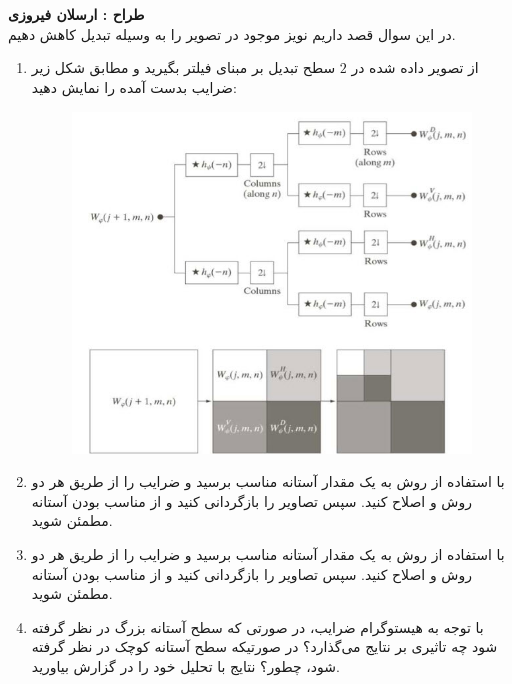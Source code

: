 \documentclass[a4paper]{article}
\begin{document}
\section{}
\textbf{طراح :‌ ارسلان فیروزی}
\vspace{0.5cm}
\\
در این سوال قصد داریم نویز موجود در تصویر
 را به وسیله تبدیل
کاهش دهیم.
\begin{enumerate}
	\item 
از تصویر داده شده در $ 2 $ سطح تبدیل
 بر مبنای فیلتر
بگیرید و مطابق شکل زیر ضرایب بدست آمده را نمایش دهید:
	\begin{figure}[H]
		\centering
		\includegraphics[width=0.7 \linewidth]{q3}
		\caption{
		}
		\label{q3}
	\end{figure}
	\item 
با استفاده از روش
 به یک مقدار آستانه مناسب برسید و ضرایب را از طریق هر دو روش 
 و 
 اصلاح کنید. سپس تصاویر را بازگردانی کنید و از مناسب بودن آستانه مطمئن شوید. 
	\item 
با استفاده از روش
 به یک مقدار آستانه مناسب برسید و ضرایب را از طریق هر دو روش 
و 
 اصلاح کنید. سپس تصاویر را بازگردانی کنید و از مناسب بودن آستانه مطمئن شوید. 
	\item 
با توجه به هیستوگرام ضرایب، در صورتی که سطح آستانه بزرگ در نظر گرفته شود چه تاثیری بر نتایج می‌‌گذارد؟ در صورتیکه سطح آستانه کوچک در نظر گرفته شود، چطور؟ نتایج با تحلیل خود را در گزارش بیاورید.
	
\end{enumerate}
\end{document}

